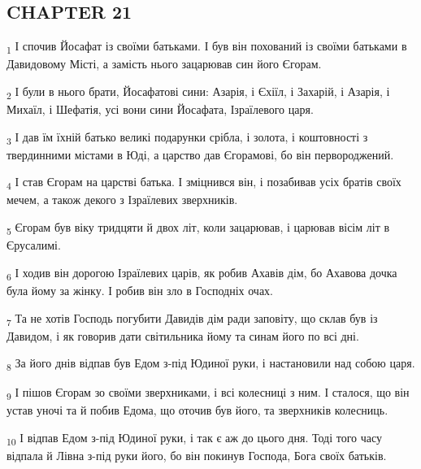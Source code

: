 \subsection{CHAPTER 21}
\begin{tcolorbox}
\textsubscript{1} І спочив Йосафат із своїми батьками. І був він похований із своїми батьками в Давидовому Місті, а замість нього зацарював син його Єгорам.
\end{tcolorbox}
\begin{tcolorbox}
\textsubscript{2} І були в нього брати, Йосафатові сини: Азарія, і Єхіїл, і Захарій, і Азарія, і Михаїл, і Шефатія, усі вони сини Йосафата, Ізраїлевого царя.
\end{tcolorbox}
\begin{tcolorbox}
\textsubscript{3} І дав їм їхній батько великі подарунки срібла, і золота, і коштовності з твердинними містами в Юді, а царство дав Єгорамові, бо він первороджений.
\end{tcolorbox}
\begin{tcolorbox}
\textsubscript{4} І став Єгорам на царстві батька. І зміцнився він, і позабивав усіх братів своїх мечем, а також декого з Ізраїлевих зверхників.
\end{tcolorbox}
\begin{tcolorbox}
\textsubscript{5} Єгорам був віку тридцяти й двох літ, коли зацарював, і царював вісім літ в Єрусалимі.
\end{tcolorbox}
\begin{tcolorbox}
\textsubscript{6} І ходив він дорогою Ізраїлевих царів, як робив Ахавів дім, бо Ахавова дочка була йому за жінку. І робив він зло в Господніх очах.
\end{tcolorbox}
\begin{tcolorbox}
\textsubscript{7} Та не хотів Господь погубити Давидів дім ради заповіту, що склав був із Давидом, і як говорив дати світильника йому та синам його по всі дні.
\end{tcolorbox}
\begin{tcolorbox}
\textsubscript{8} За його днів відпав був Едом з-під Юдиної руки, і настановили над собою царя.
\end{tcolorbox}
\begin{tcolorbox}
\textsubscript{9} І пішов Єгорам зо своїми зверхниками, і всі колесниці з ним. І сталося, що він устав уночі та й побив Едома, що оточив був його, та зверхників колесниць.
\end{tcolorbox}
\begin{tcolorbox}
\textsubscript{10} І відпав Едом з-під Юдиної руки, і так є аж до цього дня. Тоді того часу відпала й Лівна з-під руки його, бо він покинув Господа, Бога своїх батьків.
\end{tcolorbox}
